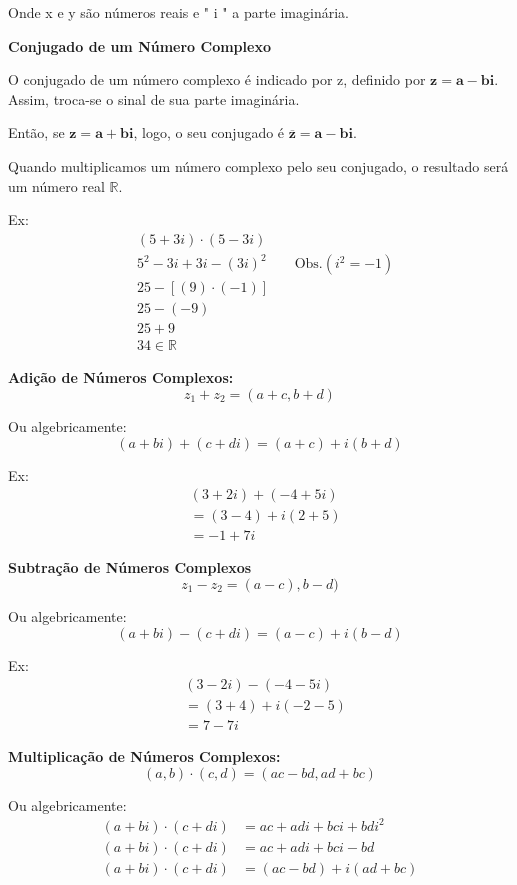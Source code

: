 \begin{multicols*}{2}
	Onde x e y são números reais e " i " a parte imaginária.

	\textbf{Conjugado de um Número Complexo}

	O conjugado de um número complexo é indicado por z, definido por $\mathbf{z = a - bi}$. Assim, troca-se o sinal de sua parte imaginária.

	Então, se $\mathbf{z = a + bi}$, logo, o seu conjugado é $\mathbf{\overline{z} = a - bi}$.

	Quando multiplicamos um número complexo pelo seu conjugado, o resultado será um número real $\mathbb{R}$.

	Ex:
	\begin{align*}
		 & (5 + 3i) \cdot (5 - 3i)                              \\
		 & 5^2 - 3i + 3i - (3i)^2 \qquad \text{Obs.} (i^2 = -1) \\
		 & 25 - [(9) \cdot (-1)]                                \\
		 & 25 - (-9)                                            \\
		 & 25 + 9                                               \\
		 & 34 \in \mathbb{R}
	\end{align*}

	\textbf{Adição de Números Complexos:}
	\[z_1 + z_2 = ( a + c, b + d)\]

	Ou algebricamente:
	\[(a + bi) + (c + di) = (a + c) + i(b + d)\]

	Ex:
	\begin{align*}
		 & (3 + 2i) + (-4 + 5i) \\
		 & = (3 - 4) + i(2 + 5) \\
		 & = -1 + 7i
	\end{align*}

	\textbf{Subtração de Números Complexos}
	\[z_1 - z_2 = (a -c), b -d)\]

	Ou algebricamente:
	\[(a + bi) - (c + di) = (a - c) + i(b - d)\]

	Ex:
	\begin{align*}
		 & (3 - 2i) - (-4 - 5i)  \\
		 & = (3 + 4) + i(-2 - 5) \\
		 & =  7 - 7i
	\end{align*}

	\textbf{Multiplicação de Números Complexos:}
	\[(a, b) \cdot (c, d) = (ac - bd, ad + bc) \]

	Ou algebricamente:
	\begin{align*}
		(a + bi) \cdot (c + di) & = ac +adi + bci +bdi^2   \\
		(a + bi) \cdot (c + di) & = ac + adi +bci - bd     \\
		(a +bi) \cdot (c + di)  & = (ac - bd) + i(ad + bc)
	\end{align*}


\end{multicols*}
